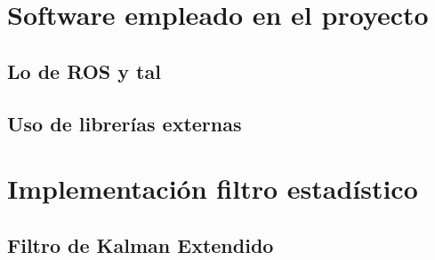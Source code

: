 \section{Software empleado en el proyecto}
\subsection{Lo de ROS y tal}
\subsection{Uso de librerías externas}

\section{Implementación filtro estadístico}
\subsection{Filtro de Kalman Extendido}
